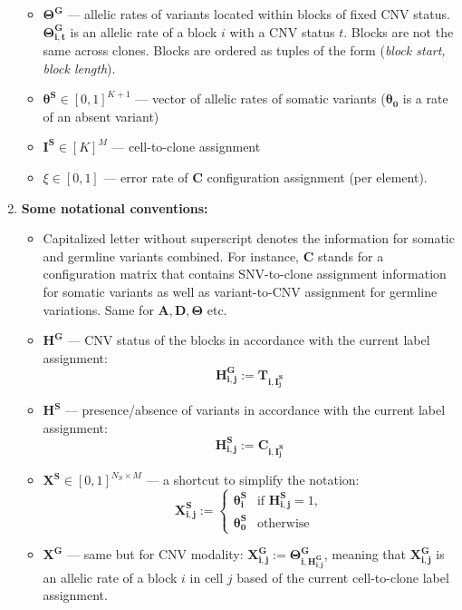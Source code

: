 \documentclass[11pt,a4paper,fullpage]{article}
\theoremstyle{definition}
\theoremstyle{definition}
\theoremstyle{definition}
\numberwithin{equation}{section}
\begin{document}
\begin{enumerate}
\begin{itemize}
			\item $ \mathbf{\Theta^{G}} $ — allelic rates of variants located within blocks of fixed CNV status. $ \mathbf{\Theta^{G}_{i,t}} $ is an allelic rate of a block $i$ with a CNV status $t$. Blocks are not the same across clones. Blocks are ordered as tuples of the form (\textit{block start, block length}).
			
			\item $ \mathbf{\theta^{S}} \in [0, 1]^{K+1} $ — vector of allelic rates of somatic variants ($ \mathbf{\theta_0} $ is a rate of an absent variant)
			
			\item $ \mathbf{I^{S}} \in [K]^{M} $ — cell-to-clone assignment
			
			\item $ \xi \in [0, 1] $ — error rate of $ \mathbf{C} $ configuration assignment (per element).
		\end{itemize}
		\item \textbf{Some notational conventions:}
		\begin{itemize}
			\item Capitalized letter without superscript denotes the information for somatic and germline variants combined. For instance, $ \mathbf{C} $ stands for a configuration matrix that contains SNV-to-clone assignment information for somatic variants as well as variant-to-CNV assignment for germline variations. Same for $  \mathbf{A}, \mathbf{D}, \mathbf{\Theta} $ etc.
			
			\item $ \mathbf{H^{G}} $ — CNV status of the blocks in accordance with the current label assignment: 
			$$ 
			\mathbf{H^{G}_{i,j}} := \mathbf{T_{i, I^{S}_{j}}}
			$$
			
			\item $ \mathbf{H^{S}} $ — presence/absence of variants in accordance with the current label assignment:
			$$
			\mathbf{H^{S}_{i, j} := \mathbf{C_{i, I^{S}_{j}}}}
			$$
			
			\item $ \mathbf{X^{S}} \in [0, 1]^{N_{S} \times M} $ — a shortcut to simplify the notation: $$ \mathbf{X^{S}_{i,j}} := \begin{cases}
			\mathbf{\theta^{S}_{i}} &\text{if } \mathbf{H^{S}_{i,j}} = 1,\\
			\mathbf{\theta^{S}_{0}} &\text{otherwise}
			\end{cases} $$
			
			\item  $ \mathbf{X^{G}} $ — same but for CNV modality: $ \mathbf{X^{G}_{i,j}} := \mathbf{\Theta^{G}_{i, H^{G}_{i,j}}} $, meaning that $\mathbf{X^{G}_{i,j}}$ is an allelic rate of a block $ i $ in cell $ j $ based of the current cell-to-clone label assignment.
		\end{itemize}
	\end{enumerate}
	
\end{document}
